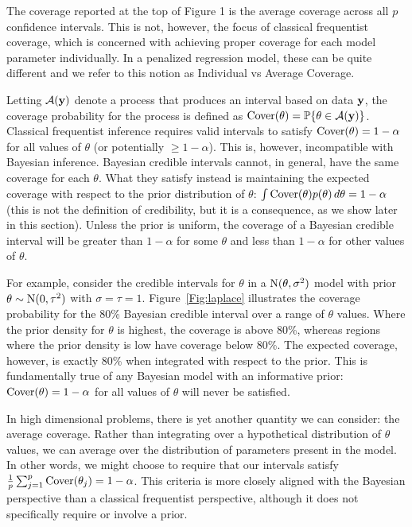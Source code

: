 The coverage reported at the top of Figure 1 is the average coverage across all $p$ confidence intervals. This is not, however, the focus of classical frequentist coverage, which is concerned with achieving proper coverage for each model parameter individually. In a penalized regression model, these can be quite different and we refer to this notion as Individual vs Average Coverage.

Letting $\mathcal{A}(\mathbf{y})$ denote a process that produces an interval based on data $\mathbf{y}$, the coverage probability for the process is defined as $\textrm{Cover}(\theta) = \mathbb{P}\{\theta \in \mathcal{A}(\mathbf{y})\}$. Classical frequentist inference requires valid intervals to satisfy $\textrm{Cover}(\theta) = 1 - \alpha$ for all values of $\theta$ (or potentially $\ge 1 - \alpha$). This is, however, incompatible with Bayesian inference. Bayesian credible intervals cannot, in general, have the same coverage for each $\theta$. What they satisfy instead is maintaining the expected coverage with respect to the prior distribution of $\theta$: $\int \textrm{Cover}(\theta)p(\theta) \, d\theta = 1 - \alpha$ (this is not the definition of credibility, but it is a consequence, as we show later in this section). Unless the prior is uniform, the coverage of a Bayesian credible interval will be greater than $1-\alpha$ for some $\theta$ and less than $1-\alpha$ for other values of $\theta$.

For example, consider the credible intervals for $\theta$ in a $\textrm{N}(\theta, \sigma^2)$ model with prior $\theta \sim \textrm{N}(0, \tau^2)$ with $\sigma = \tau = 1$. Figure~\ref{Fig:laplace} illustrates the coverage probability for the 80\% Bayesian credible interval over a range of $\theta$ values. Where the prior density for $\theta$ is highest, the coverage is above 80\%, whereas regions where the prior density is low have coverage below 80\%. The expected coverage, however, is exactly 80\% when integrated with respect to the prior. This is fundamentally true of any Bayesian model with an informative prior: $\textrm{Cover}(\theta) = 1 - \alpha$ for all values of $\theta$ will never be satisfied.

In high dimensional problems, there is yet another quantity we can consider: the average coverage. Rather than integrating over a hypothetical distribution of $\theta$ values, we can average over the distribution of parameters present in the model. In other words, we might choose to require that our intervals satisfy $\tfrac{1}{p} \sum_{j=1}^p \textrm{Cover}(\theta_j) = 1-\alpha$. This criteria is more closely aligned with the Bayesian perspective than a classical frequentist perspective, although it does not specifically require or involve a prior.

